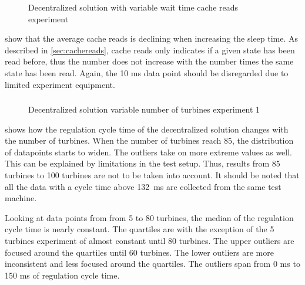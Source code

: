 \begin{figure}[h!]
	\centering
	
	\caption{Decentralized solution with variable wait time cache reads experiment}
	\label{fig:exp:decen:sleep-cache}
\end{figure}

\FloatBarrier

 show that the average cache reads is declining when increasing the sleep time. As described in \cref{sec:cachereads}, cache reads only indicates if a given state has been read before, thus the number does not increase with the number times the same state has been read. Again, the 10 ms data point should be disregarded due to limited experiment equipment.

\clearpage
\subsubsection{}

\begin{figure}[h!]
	\centering
%	
	
	
	\caption{Decentralized solution variable number of turbines experiment 1}
	\label{fig:exp:decen:turbines}
\end{figure}

 shows how the regulation cycle time of the decentralized solution changes with the number of turbines.
When the number of turbines reach 85, the distribution of datapoints starts to widen. The outliers take on more extreme values as well. This can be explained by limitations in the test setup. Thus, results from 85 turbines to 100 turbines are not to be taken into account.
It should be noted that all the data with a cycle time above 132~ms are collected from the same test machine.

Looking at data points from from 5 to 80 turbines, the median of the regulation cycle time is nearly constant.
The quartiles are with the exception of the 5 turbines experiment of almost constant until 80 turbines. The upper outliers are focused around the quartiles until 60 turbines. The lower outliers are more inconsistent and less focused around the quartiles.
The outliers span from 0 ms to 150 ms of regulation cycle time.

